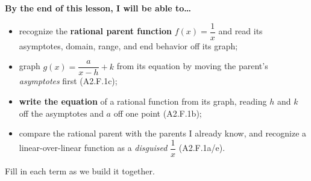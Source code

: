 \documentclass[10pt]{article}
\begin{document}
\namedateperiod

\vspace{0.08in}

\begin{objectivebox}
\textbf{By the end of this lesson, I will be able to\dots}
\begin{itemize}\setlength{\itemsep}{2pt}
  \item recognize the \textbf{rational parent function} $f(x)=\dfrac{1}{x}$ and read its asymptotes, domain, range, and end behavior off its graph;
  \item graph $g(x)=\dfrac{a}{x-h}+k$ from its equation by moving the parent's \emph{asymptotes} first (A2.F.1c);
  \item \textbf{write the equation} of a rational function from its graph, reading $h$ and $k$ off the asymptotes and $a$ off one point (A2.F.1b);
  \item compare the rational parent with the parents I already know, and recognize a linear-over-linear function as a \emph{disguised} $\dfrac1x$ (A2.F.1a/e).
\end{itemize}
\end{objectivebox}

\vspace{0.05in}

\begin{vocabbox}
\small
Fill in each term as we build it together.
\par\vspace{2pt}   %
\end{vocabbox}
\end{document}
